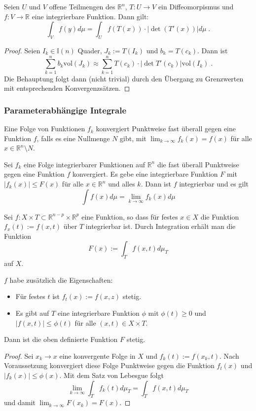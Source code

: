 \begin{Satz}
Seien $U$ und $V$ offene Teilmengen des $\mathbb{R}^n$, $T: U \to V$ ein Diffeomorpismus und $f: V \to \mathbb{R}$ eine integrierbare Funktion. Dann gilt:
$$ \int_V  f(y)  d \mu = \int_U f(T (x))  \cdot | \det(T' (x)) | d \mu   \; .$$
\end{Satz}
\begin{proof}
Seien $I_k \in \mathbb{I}(n)$ Quader, $J_k := T(I_k)$ und $b_k = T(c_k)$. Dann ist 
$$\sum_{k=1}^n  b_k  \text{vol}(J_k) \approx  \sum_{k=1}^n T(c_k) \cdot | \det T' (c_k)|  \text{vol}(I_k) \; .$$
Die Behauptung folgt dann (nicht trivial) durch den Übergang zu Grenzwerten mit entsprechenden Konvergenzsätzen.
\end{proof}




\subsubsection{Parameterabhängige Integrale}

\begin{Definition}
Eine Folge von Funktionen $f_k$ konvergiert Punktweise fast überall gegen eine Funktion $f$, falls es eine Nullmenge $N$ gibt, mit 
$\lim_{k \to \infty} f_k (x) = f(x)$ für alle $x \in \mathbb{R}^n \setminus N$.
\end{Definition}

\begin{Satz}
Sei $f_k$ eine Folge integrierbarer Funktionen auf $\mathbb{R}^n$ die fast überall Punktweise gegen eine Funktion $f$ konvergiert.
Es gebe eine integrierbare Funktion $F$ mit $|f_k (x)| \leq F(x) $ für alle $x \in \mathbb{R}^n$ und alles $k$. Dann ist $f$ integrierbar und es gilt
$$ \int f(x) d \mu = \lim_{k \to \infty} f_k(x) d \mu $$
\end{Satz}

Sei $f: X \times T \subset \mathbb{R}^{n-p} \times \mathbb{R}^p$ eine Funktion, so dass für festes $x \in X$ die Funktion $f_x(t) := f(x,t)$ über $T$ integrierbar ist. Durch Integration erhält man die Funktion 
$$ F(x) := \int_T f(x,t)  d \mu_T$$ 
auf $X$.

\begin{Satz}[Stetigkeitssatz]
$f$ habe zusätzlich die Eigenschaften:
\begin{itemize}
\item Für festes $t$ ist $f_t(x):= f(x,z)$ stetig.
\item Es gibt auf $T$ eine integrierbare Funktion $\phi$ mit $\phi(t) \geq 0$ und $|f(x,t)| \leq \phi(t)$ für alle $(x,t) \in X \times T$.
\end{itemize}
Dann ist die oben definierte Funktion $F$ stetig. 
\end{Satz}
\begin{proof}
Sei  $x_k \to x$   eine konvergente Folge in $X$ und $f_k(t):= f(x_k,t)$. Nach Voraussetzung konvergiert diese Folge Punktweise gegen die Funktion $f_t(x)$ und $| f_k (x) | \leq \phi(x)$. Mit dem Satz von Lebesgue folgt
$$ \lim_{k \to \infty} \int_T f_k(t) d \mu_T = \int_T f(x,t) d \mu_T$$
und damit $ \lim_{k \to \infty} F(x_k) =  F(x)$.
\end{proof}


